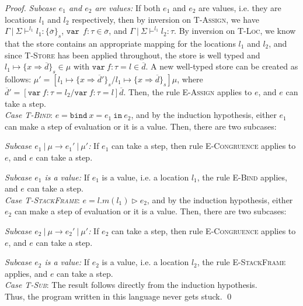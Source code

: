 \documentclass{llncs}
\newcommand{\keywadj}[1]{\mathtt{#1}}
\newcommand{\keyw}[1]{\keywadj{#1}~}
\begin{document}
\begin{proof}
\textit{Subcase $e_1$ and $e_2$ are values:} If both $e_1$ and $e_2$ are values, i.e. they are locations $l_1$ and $l_2$ respectively, then by inversion on \textsc{T-Assign}, we have $\Gamma~|~\Sigma \vdash^{l_1} l_1 : \{ \overline{\sigma} \}_s$, $\keyw{var}~ f : \tau \in \overline{\sigma}$, and $\Gamma~|~\Sigma \vdash^{l_1} l_2 : \tau$. By inversion on \textsc{T-Loc}, we know that the store contains an appropriate mapping for the locations $l_1$ and $l_2$, and since \textsc{T-Store} has been applied throughout, the store is well typed and $l_1 \mapsto \{ x \Rightarrow \overline{d} \}_{s} \in \mu$ with $\keyw{var} f : \tau = l \in \overline{d}$. A new well-typed store can be created as follows: $\mu' = [l_1 \mapsto \{ x \Rightarrow \overline{d}' \}_{s}/l_1 \mapsto \{ x \Rightarrow \overline{d} \}_{s}]\mu$, where $\overline{d}' = [\keyw{var} f : \tau = l_2/\keyw{var} f : \tau = l]\overline{d}$. Then, the rule \textsc{E-Assign} applies to $e$, and $e$ can take a step.
\\

\noindent\textit{Case \textsc{T-Bind}}:
$e =  \keyw{bind} x = e_1~\keyw{in} e_2$, and by the induction hypothesis, either $e_1$ can make a step of evaluation or it is a value. Then, there are two subcases:

\textit{Subcase $e_1~|~\mu \longrightarrow e_1'~|~\mu'$:} If $e_1$ can take a step, then rule \textsc{E-Congruence} applies to $e$, and $e$ can take a step.

\textit{Subcase $e_1$ is a value:} If $e_1$ is a value, i.e. a location $l_1$, the rule \textsc{E-Bind} applies, and $e$ can take a step.
\\

\noindent\textit{Case \textsc{T-StackFrame}}:
$e = l.m(l_1) \rhd e_2$, and by the induction hypothesis, either $e_2$ can make a step of evaluation or it is a value. Then, there are two subcases:

\textit{Subcase $e_2~|~\mu \longrightarrow e_2'~|~\mu'$:} If $e_2$ can take a step, then rule \textsc{E-Congruence} applies to $e$, and $e$ can take a step.

\textit{Subcase $e_2$ is a value:} If $e_2$ is a value, i.e. a location $l_2$, the rule \textsc{E-StackFrame} applies, and $e$ can take a step.
\\

\noindent\textit{Case \textsc{T-Sub}}:
The result follows directly from the induction hypothesis.
\\

\noindent Thus, the program written in this language never gets stuck. \qed

\end{proof}
\end{document}

